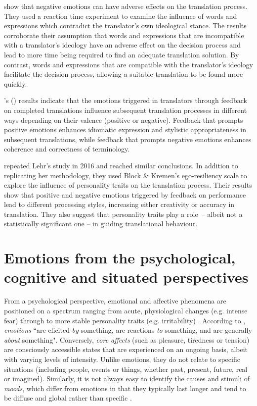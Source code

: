 \documentclass[output=paper]{langscibook}
\begin{document}
\citet{RojoLópez2014} show that negative emotions can have adverse effects on the translation process. They used a reaction time experiment to examine the influence of words and expressions which contradict the translator’s own ideological stance. The results corroborate their assumption that words and expressions that are incompatible with a translator’s ideology have an adverse effect on the decision process and lead to more time being required to find an adequate translation solution. By contrast, words and expressions that are compatible with the translator's ideology facilitate the decision process, allowing a suitable translation to be found more quickly.

\citeauthor{Lehr2014}'s (\citeyear{Lehr2014}) results indicate that the emotions triggered in translators through feedback on completed translations influence subsequent translation processes in different ways depending on their valence (positive or negative). Feedback that prompts positive emotions enhances idiomatic expression and stylistic appropriateness in subsequent translations, while feedback that prompts negative emotions enhances coherence and correctness of terminology.

\citeauthor{RojoLópez2016} repeated Lehr’s study in 2016 and reached similar conclusions. In addition to replicating her methodology, they used Block \& Kremen’s ego-resiliency scale to explore the influence of personality traits on the translation process. Their results show that positive and negative emotions triggered by feedback on performance lead to different processing styles, increasing either creativity or accuracy in translation. They also suggest that personality traits play a role~-- albeit not a statistically significant one -- in guiding translational behaviour.

\section{Emotions from the psychological, cognitive and situated perspectives}
From a psychological perspective, emotional and affective phenomena are positioned on a spectrum ranging from acute, physiological changes (e.g. intense fear) through to more stable personality traits (e.g. irritability) \citep[40]{Davou2007}. According to \citet[322]{Ekkekakis2012}, \textit{emotions} “are elicited \textit{by} something, are reactions \textit{to} something, and are generally \textit{about} something". Conversely, \textit{core affects} (such as pleasure, tiredness or tension) are consciously accessible states that are experienced on an ongoing basis, albeit with varying levels of intensity. Unlike emotions, they do not relate to specific situations (including people, events or things, whether past, present, future, real or imagined). Similarly, it is not always easy to identify the causes and stimuli of \textit{moods}, which differ from emotions in that they typically last longer and tend to be diffuse and global rather than specific \citep[322]{Ekkekakis2012}.
\end{document}
